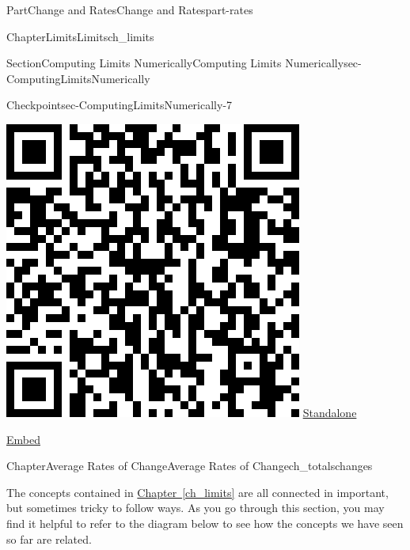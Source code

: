 \documentclass{tufte-book}
\newcommand{\xreffont}{\relax}
\numberwithin{equation}{chapter}
\begin{document}
\begin{partptx}{Part}{Change and Rates}{}{Change and Rates}{}{}{part-rates}
\begin{chapterptx}{Chapter}{Limits}{}{Limits}{}{}{ch_limits}
\begin{sectionptx}{Section}{Computing Limits Numerically}{}{Computing Limits Numerically}{}{}{sec-ComputingLimitsNumerically}
\begin{inlineexercise}{Checkpoint}{}{sec-ComputingLimitsNumerically-7}
\begin{sidebyside}{2}{0.075}{0.075}{0.17}
\begin{sbspanel}{0.21}
\includegraphics[width=\linewidth]{generated/qrcode/sec-ComputingLimitsNumerically-7-2-3.png}
\href{http://webwork.bridgew.edu/oer/functions_at_work/sec-ComputingLimitsNumerically-7-2-3.html}{Standalone}%
\par
\href{http://webwork.bridgew.edu/oer/functions_at_work/sec-ComputingLimitsNumerically-7-2-3-if.html}{Embed}%
\end{sbspanel}%
\end{sidebyside}%
\end{inlineexercise}%
\end{sectionptx}
\end{chapterptx}
%
\typeout{************************************************}
\typeout{************************************************}
%
\begin{chapterptx}{Chapter}{Average Rates of Change}{}{Average Rates of Change}{}{}{ch_totalschanges}
\renewcommand*{\chaptername}{Chapter}
\begin{introduction}{}%
The concepts contained in \hyperref[ch_limits]{Chapter~{\xreffont\ref{ch_limits}}\textendash{}{\xreffont\ref{ch_tangentsecant}}} are all connected in important, but sometimes tricky to follow ways.  As you go through this section, you may find it helpful to refer to the diagram below to see how the concepts we have seen so far are related.%

\end{introduction}
\end{chapterptx}
\end{partptx}
\end{document}
